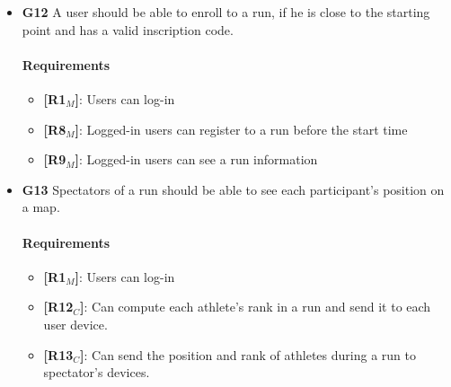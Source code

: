 \begin{itemize}
   
    \item \textbf{G12} A user should be able to enroll to a run, if he is close to the starting point and has a valid inscription code.
    \paragraph{Requirements}
   \begin{itemize}
    \item \textbf{[R1$_M$]}: Users can log-in
    \item \textbf{[R8$_M$]}: Logged-in users can register to a run before the start time
    \item \textbf{[R9$_M$]}: Logged-in users can see a run information
   \end{itemize}

   
   
    \item \textbf{G13} Spectators of a run should be able to see each participant's position on a map.
    \paragraph{Requirements}
   \begin{itemize}
    \item \textbf{[R1$_M$]}: Users can log-in
    \item \textbf{[R12$_C$]}: Can compute each athlete's rank in a run and send it to each user device.
    \item \textbf{[R13$_C$]}: Can send the position and rank of athletes during a run to spectator's devices.
   \end{itemize}
   
   \end{itemize}

   
   